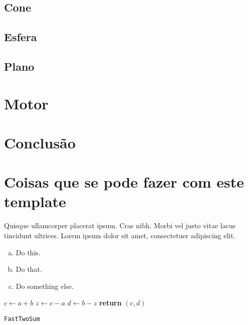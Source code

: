 \documentclass{article}
\begin{document}
\subsection{Cone}

\subsection{Esfera}

\subsection{Plano}

\section{Motor}

\section{Conclusão}

\appendix

\section{Coisas que se pode fazer com este template}

\begin{question}
	Quisque ullamcorper placerat ipsum. Cras nibh. Morbi vel justo vitae lacus tincidunt ultrices. Lorem ipsum dolor sit amet, consectetuer adipiscing elit.

	\begin{enumerate}[(a)]
		\item Do this.
		\item Do that.
		\item Do something else.
	\end{enumerate}
\end{question}
	
\begin{center}
	\begin{minipage}{0.5\linewidth} %
		\begin{algorithm}[H]
			\medskip
			$c \leftarrow a + b$ \;
			$z \leftarrow c - a$ \;
			$d \leftarrow b - z$ \;
			{\bf return} $(c,d)$ \;
			\caption{\texttt{FastTwoSum}} %
			\label{alg:fastTwoSum}   %
		\end{algorithm}
	\end{minipage}
\end{center}
\end{document}
